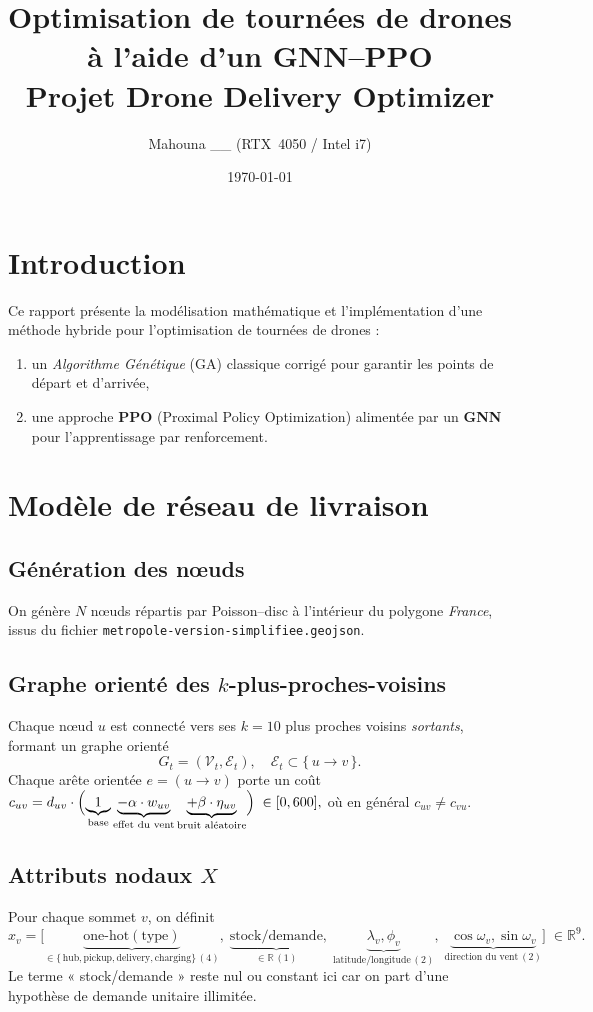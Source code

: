 \documentclass[11pt,a4paper]{article}
\title{\texorpdfstring{Optimisation de tournées de drones à l'aide d'un GNN--PPO\\\small Projet Drone Delivery Optimizer}{Optimisation de tournées de drones à l'aide d'un GNN-PPO - Projet Drone Delivery Optimizer}}
\author{\texorpdfstring{\small Mahouna \_\_ \quad (RTX~4050 / Intel i7)}{Mahouna __ (RTX 4050 / Intel i7)}}
\date{\today}
\newcommand{\R}{\mathbb{R}}
\begin{document}
\maketitle
\tableofcontents
\newpage

\section{Introduction}
Ce rapport présente la modélisation mathématique et l'implémentation d'une méthode hybride pour l'optimisation de tournées de drones : 
\begin{enumerate}
  \item un \emph{Algorithme Génétique} (GA) classique corrigé pour garantir les points de départ et d'arrivée,
  \item une approche \textbf{PPO} (Proximal Policy Optimization) alimentée par un \textbf{GNN} pour l'apprentissage par renforcement.
\end{enumerate}

\section{Modèle de réseau de livraison}
\subsection{Génération des nœuds}
On génère \(N\) nœuds répartis par Poisson–disc à l'intérieur du polygone \emph{France}, issus du fichier \texttt{metropole-version-simplifiee.geojson}.

\subsection{Graphe orienté des \texorpdfstring{\(k\)}{k}-plus-proches-voisins}
Chaque nœud \(u\) est connecté vers ses \(k=10\) plus proches voisins \emph{sortants}, formant un graphe orienté 
\[
  G_t = (\mathcal{V}_t,\mathcal{E}_t),\quad \mathcal{E}_t\subset \{\,u\to v\,\}.
\]
Chaque arête orientée \(e=(u\!\to\!v)\) porte un coût 
\(
  c_{uv}
  = d_{uv} \cdot \Bigl(
  \underbrace{1}_{\text{base}}
  \underbrace{- \alpha \cdot w_{uv}}_{\text{effet du vent}}
  \underbrace{+ \beta \cdot \eta_{uv}}_{\text{bruit aléatoire}}
  \Bigr)
  \;\in[0,600],
\)
où en général \(c_{uv}\neq c_{vu}\).

\subsection{Attributs nodaux \texorpdfstring{\(X\)}{X}}
Pour chaque sommet \(v\), on définit
\[
  x_v = \bigl[
    \underbrace{\text{one-hot}(\text{type})}_{\in\{\,\text{hub},\text{pickup},\text{delivery},\text{charging}\}\, (4)},
    \;
    \underbrace{\text{stock/demande}}_{\in\R\, (1)},
    \;
    \underbrace{\lambda_v,\phi_v}_{\text{latitude/longitude}\,(2)},
    \;
    \underbrace{\cos\omega_v,\sin\omega_v}_{\text{direction du vent}\,(2)}
  \bigr]\;\in\R^{9}.
\]
Le terme « stock/demande » reste nul ou constant ici car on part d'une hypothèse de demande unitaire illimitée.
\end{document}
